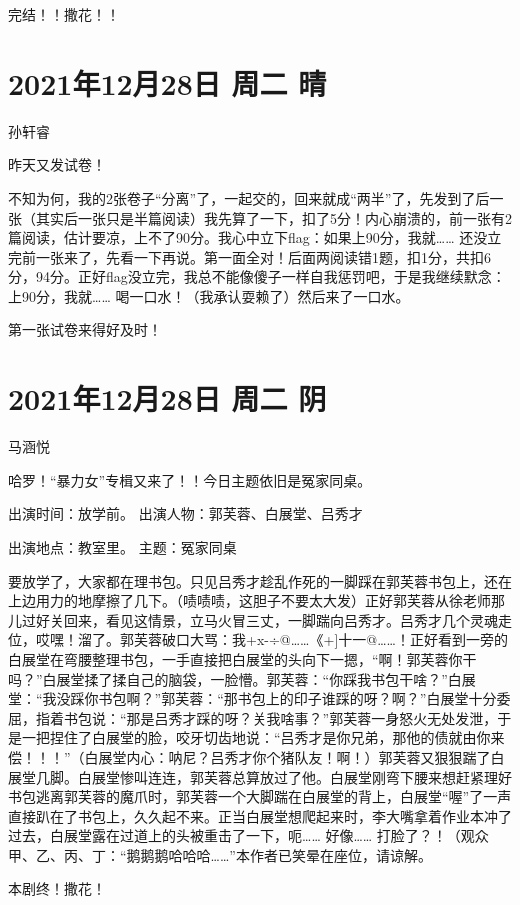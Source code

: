 完结！！撒花！！

\section{2021年12月28日 周二 晴}

孙轩睿

昨天又发试卷！

不知为何，我的2张卷子“分离”了，一起交的，回来就成“两半”了，先发到了后一张（其实后一张只是半篇阅读）我先算了一下，扣了5分！内心崩溃的，前一张有2篇阅读，估计要凉，上不了90分。我心中立下flag：如果上90分，我就…… 还没立完前一张来了，先看一下再说。第一面全对！后面两阅读错1题，扣1分，共扣6分，94分。正好flag没立完，我总不能像傻子一样自我惩罚吧，于是我继续默念：上90分，我就…… 喝一口水！（我承认耍赖了）然后来了一口水。

第一张试卷来得好及时！

\section{2021年12月28日 周二 阴}

马涵悦

哈罗！“暴力女”专楫又来了！！今日主题依旧是冤家同桌。

出演时间：放学前。 出演人物：郭芙蓉、白展堂、吕秀才

出演地点：教室里。 主题：冤家同桌

要放学了，大家都在理书包。只见吕秀才趁乱作死的一脚踩在郭芙蓉书包上，还在上边用力的地摩擦了几下。（啧啧啧，这胆子不要太大发）正好郭芙蓉从徐老师那儿过好关回来，看见这情景，立马火冒三丈，一脚踹向吕秀才。吕秀才几个灵魂走位，哎嘿！溜了。郭芙蓉破口大骂：我+x-÷@……《+{]}十一@……！正好看到一旁的白展堂在弯腰整理书包，一手直接把白展堂的头向下一摁，“啊！郭芙蓉你干吗？”白展堂揉了揉自己的脑袋，一脸懵。郭芙蓉：“你踩我书包干啥？”白展堂：“我没踩你书包啊？”郭芙蓉：“那书包上的印子谁踩的呀？啊？”白展堂十分委屈，指着书包说：“那是吕秀才踩的呀？关我啥事？”郭芙蓉一身怒火无处发泄，于是一把捏住了白展堂的脸，咬牙切齿地说：“吕秀才是你兄弟，那他的债就由你来偿！！！”（白展堂内心：呐尼？吕秀才你个猪队友！啊！）郭芙蓉又狠狠踹了白展堂几脚。白展堂惨叫连连，郭芙蓉总算放过了他。白展堂刚弯下腰来想赶紧理好书包逃离郭芙蓉的魔爪时，郭芙蓉一个大脚踹在白展堂的背上，白展堂“喔”了一声直接趴在了书包上，久久起不来。正当白展堂想爬起来时，李大嘴拿着作业本冲了过去，白展堂露在过道上的头被重击了一下，呃…… 好像…… 打脸了？！（观众甲、乙、丙、丁：“鹅鹅鹅哈哈哈……”本作者已笑晕在座位，请谅解。

本剧终！撒花！

